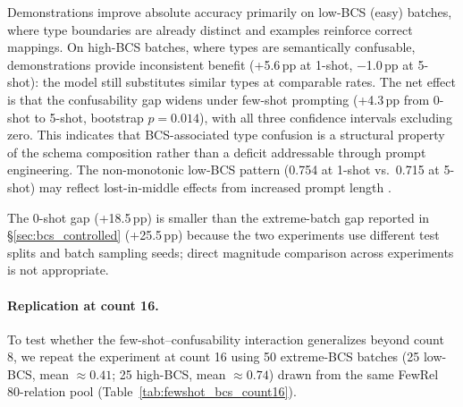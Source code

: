 \documentclass[11pt]{article}
\begin{document}
Demonstrations improve absolute accuracy primarily on low-BCS (easy) batches, where type boundaries are already distinct and examples reinforce correct mappings. On high-BCS batches, where types are semantically confusable, demonstrations provide inconsistent benefit (+5.6\,pp at 1-shot, $-$1.0\,pp at 5-shot): the model still substitutes similar types at comparable rates. The net effect is that the confusability gap widens under few-shot prompting (+4.3\,pp from 0-shot to 5-shot, bootstrap $p = 0.014$), with all three confidence intervals excluding zero. This indicates that BCS-associated type confusion is a structural property of the schema composition rather than a deficit addressable through prompt engineering. The non-monotonic low-BCS pattern (0.754 at 1-shot vs.\ 0.715 at 5-shot) may reflect lost-in-middle effects from increased prompt length \citep{lost-in-middle-2024}.

The 0-shot gap (+18.5\,pp) is smaller than the extreme-batch gap reported in \S\ref{sec:bcs_controlled} (+25.5\,pp) because the two experiments use different test splits and batch sampling seeds; direct magnitude comparison across experiments is not appropriate.

\paragraph{Replication at count 16.}
To test whether the few-shot--confusability interaction generalizes beyond count 8, we repeat the experiment at count 16 using 50 extreme-BCS batches (25 low-BCS, mean $\approx 0.41$; 25 high-BCS, mean $\approx 0.74$) drawn from the same FewRel 80-relation pool (Table~\ref{tab:fewshot_bcs_count16}).

\begin{table}[h]
\centering
\small
\caption{BCS gap under few-shot prompting (FewRel, count 16). The 1-shot gap (+18.4\,pp) exceeds the 0-shot gap (+15.7\,pp), replicating the widening pattern observed at count 8. The 5-shot gap (+16.7\,pp) retreats from the 1-shot peak, consistent with prompt-length ceiling effects at higher type counts.}
\label{tab:fewshot_bcs_count16}
\end{table}
\end{document}
